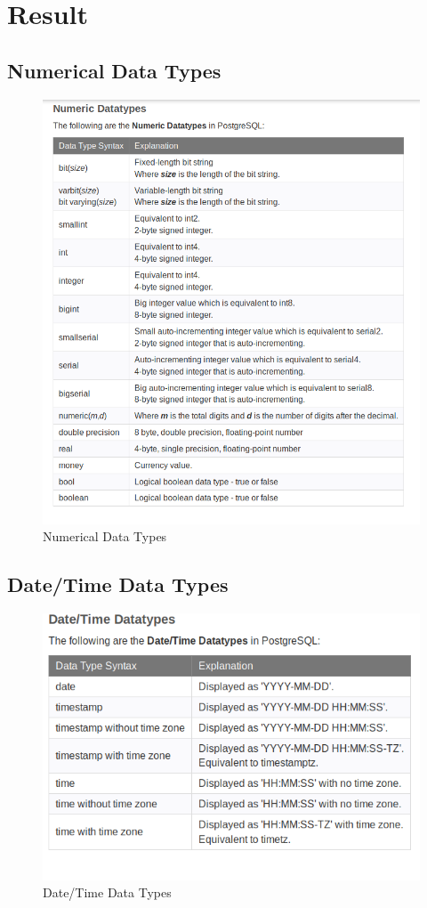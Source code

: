 \documentclass{article}
\begin{document}
\section{Result}

\subsection{Numerical Data Types}
\begin{figure}[H]
\centering
\includegraphics[width=15cm]{2.png}
\caption{Numerical Data Types}\label{delete}
\end{figure}

\subsection{Date/Time Data Types}
\begin{figure}[H]
\centering
\includegraphics[width=15cm]{3.png}
\caption{Date/Time  Data Types}\label{delete}
\end{figure}
\end{document}

